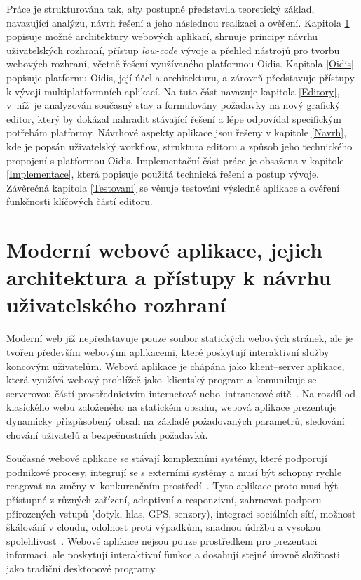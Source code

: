 Práce je strukturována tak, aby postupně představila teoretický základ, navazující analýzu, návrh řešení a jeho následnou realizaci a ověření. Kapitola \ref{Teorie} popisuje možné architektury webových aplikací, shrnuje principy návrhu uživatelských rozhraní, přístup \textit{low-code} vývoje a přehled nástrojů pro tvorbu webových rozhraní, včetně řešení využívaného platformou Oidis. Kapitola \ref{Oidis} popisuje platformu Oidis, její účel a architekturu, a zároveň představuje přístupy k vývoji multiplatformních aplikací. Na tuto část navazuje kapitola \ref{Editory}, v~níž~je analyzován současný stav a formulovány požadavky na nový grafický editor, který by dokázal nahradit stávající řešení a lépe odpovídal specifickým potřebám platformy. Návrhové aspekty aplikace jsou řešeny v kapitole \ref{Navrh}, kde je popsán uživatelský workflow, struktura editoru a způsob jeho technického propojení s platformou Oidis. Implementační část práce je obsažena v kapitole \ref{Implementace}, která popisuje použitá technická řešení a postup vývoje. Závěrečná kapitola \ref{Testovani} se věnuje testování výsledné aplikace a ověření funkčnosti klíčových částí editoru.


\chapter{Moderní webové aplikace, jejich architektura a přístupy k návrhu uživatelského rozhraní}
\label{Teorie}
Moderní web již nepředstavuje pouze soubor statických webových stránek, ale je tvořen především webovými aplikacemi, které poskytují interaktivní služby koncovým uživatelům. Webová aplikace je chápána jako klient–server aplikace, která využívá webový prohlížeč jako~klientský program a komunikuje se serverovou částí prostřednictvím internetové nebo~intranetové sítě~\cite{WebApps}. Na rozdíl od klasického webu založeného na statickém obsahu, webová aplikace prezentuje dynamicky přizpůsobený obsah na základě požadovaných parametrů, sledování chování uživatelů a bezpečnostních požadavků.

Současné webové aplikace se stávají komplexními systémy, které podporují podnikové procesy, integrují se s externími systémy a musí být schopny rychle reagovat na změny v~konkurenčním prostředí~\cite{Shirani2004}. Tyto aplikace proto musí být přístupné z různých zařízení, adaptivní a responzivní, zahrnovat podporu přirozených vstupů (dotyk, hlas, GPS, senzory), integraci sociálních sítí, možnost škálování v cloudu, odolnost proti výpadkům, snadnou údržbu a vysokou spolehlivost~\cite{Ciliberti2013}. Webové aplikace nejsou pouze prostředkem pro prezentaci informací, ale poskytují interaktivní funkce a dosahují stejné úrovně složitosti jako tradiční desktopové programy.


